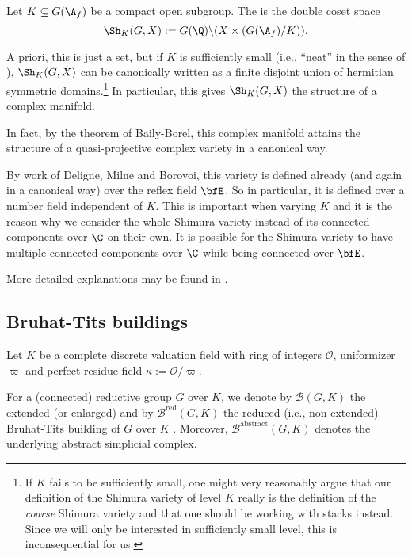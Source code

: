 \documentclass[a4paper]{scrartcl} %
\numberwithin{equation}{section}
\begin{document}
\begin{DefinitionRemark}\label{shvar}
  Let $K\subseteq G(\A_f)$ be a compact open subgroup. The  is the double coset space
  \begin{equation*}
    \Sh_K(G,X):=G(\Q)\backslash (X\times (G(\A_f)/K)).
  \end{equation*}

  A priori, this is just a set, but if $K$ is sufficiently small (i.e., ``neat'' in the sense of \cite{borelarith,pink}), $\Sh_K(G,X)$ can be canonically written as a finite disjoint union of hermitian symmetric domains.\footnote{If $K$ fails to be sufficiently small, one might very reasonably argue that our definition of the Shimura variety of level $K$ really is the definition of the \emph{coarse} Shimura variety and that one should be working with stacks instead.  Since we will only be interested in sufficiently small level, this is inconsequential for us.}  In particular, this gives $\Sh_K(G,X)$ the structure of a complex manifold.

  In fact, by the theorem of Baily-Borel, this complex manifold attains the structure of a quasi-projective complex variety in a canonical way.

  By work of Deligne, Milne and Borovoi, this variety is defined already (and again in a canonical way) over the reflex field $\bfE$. So in particular, it is defined over a number field independent of $K$.  This is important when varying $K$ and it is the reason why we consider the whole Shimura variety instead of its connected components over $\C$ on their own.  It is possible for the Shimura variety to have multiple connected components over $\C$ while being connected over $\bfE$.

  More detailed explanations may be found in \cite{milne-isv}.
\end{DefinitionRemark}





\subsection{Bruhat-Tits buildings}
\label{sec:bruh-tits-build}

Let $K$ be a complete discrete valuation field with ring of integers $\mathcal{O}$, uniformizer $\varpi$ and perfect residue field $\kappa:=\mathcal{O}/\varpi$.

\begin{Notation}
  For a (connected) reductive group $G$ over $K$, we denote by $\mathcal{B}(G,K)$ the extended (or enlarged) and by $\mathcal{B}^\mathrm{red}(G,K)$ the reduced (i.e., non-extended) Bruhat-Tits building of $G$ over $K$ \cite{bt-ii}. Moreover, $\mathcal{B}^\mathrm{abstract}(G,K)$ denotes the underlying abstract simplicial complex.
\end{Notation}
\end{document}
